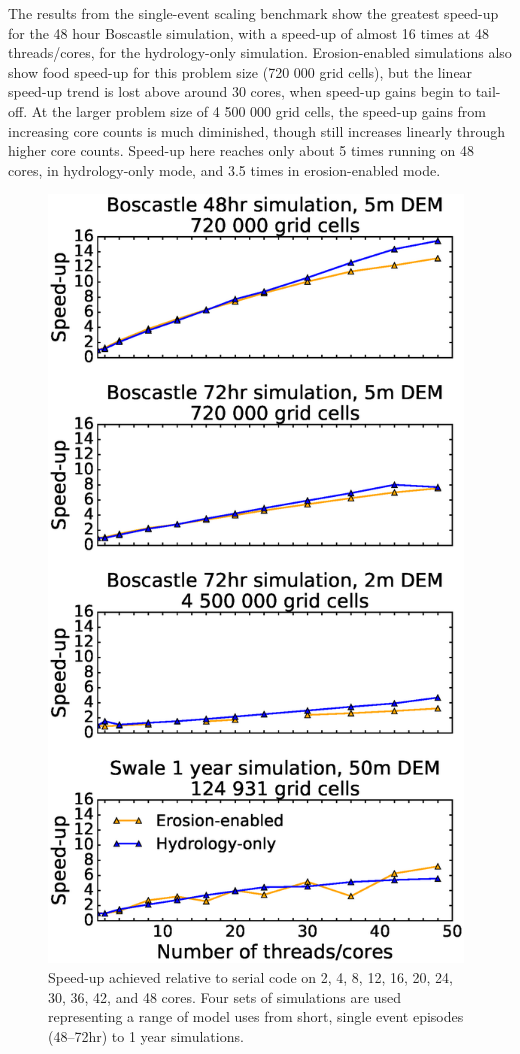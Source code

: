 The results from the single-event scaling benchmark show the greatest speed-up for the 48 hour Boscastle simulation, with a speed-up of almost 16 times at 48 threads/cores, for the hydrology-only simulation. Erosion-enabled simulations also show food speed-up for this problem size (720 000 grid cells), but the linear speed-up trend is lost above around 30 cores, when speed-up gains begin to tail-off. At the larger problem size of 4 500 000 grid cells, the speed-up gains from increasing core counts is much diminished, though still increases linearly through higher core counts. Speed-up here reaches only about 5 times running on 48 cores, in hydrology-only mode, and 3.5 times in erosion-enabled mode.

\begin{figure}[t]
\includegraphics[width=11cm]{chp05_figures_scripts/strong_scale_four.eps}
\caption{Speed-up achieved relative to serial code on 2, 4, 8, 12, 16, 20, 24, 30, 36, 42, and 48 cores. Four sets of simulations are used representing a range of model uses from short, single event episodes (48--72hr) to 1 year simulations.}
\label{fig_strong_scale_multi}
\end{figure}

